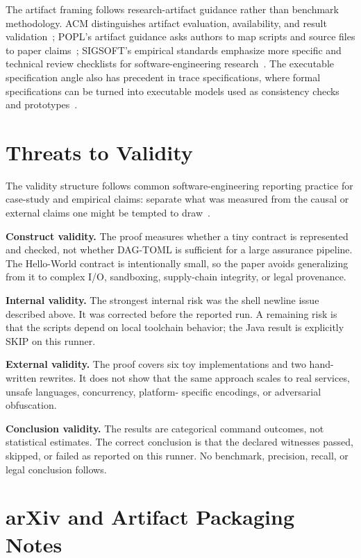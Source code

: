 \documentclass[11pt,letterpaper]{article}
\newcommand{\dagtoml}{DAG-TOML}
\begin{document}
The artifact framing follows research-artifact guidance rather than
benchmark methodology. ACM distinguishes artifact evaluation,
availability, and result validation~\cite{acmBadging2020}; POPL's
artifact guidance asks authors to map scripts and source files to paper
claims~\cite{poplArtifact2023}; SIGSOFT's empirical standards emphasize
more specific and technical review checklists for software-engineering
research~\cite{sigsoftStandards,ralph2020empirical}. The executable
specification angle also has precedent in trace specifications, where
formal specifications can be turned into executable models used as
consistency checks and prototypes~\cite{hoffman1988trace}.

\section{Threats to Validity}

The validity structure follows common software-engineering reporting
practice for case-study and empirical claims: separate what was
measured from the causal or external claims one might be tempted to
draw~\cite{runeson2009case,feldt2010validity}.

\textbf{Construct validity.} The proof measures whether a tiny contract
is represented and checked, not whether \dagtoml{} is sufficient for a
large assurance pipeline. The Hello-World contract is intentionally
small, so the paper avoids generalizing from it to complex I/O,
sandboxing, supply-chain integrity, or legal provenance.

\textbf{Internal validity.} The strongest internal risk was the shell
newline issue described above. It was corrected before the reported
run. A remaining risk is that the scripts depend on local toolchain
behavior; the Java result is explicitly SKIP on this runner.

\textbf{External validity.} The proof covers six toy implementations
and two hand-written rewrites. It does not show that the same approach
scales to real services, unsafe languages, concurrency, platform-
specific encodings, or adversarial obfuscation.

\textbf{Conclusion validity.} The results are categorical command
outcomes, not statistical estimates. The correct conclusion is that the
declared witnesses passed, skipped, or failed as reported on this
runner. No benchmark, precision, recall, or legal conclusion follows.

\section{arXiv and Artifact Packaging Notes}
\end{document}
